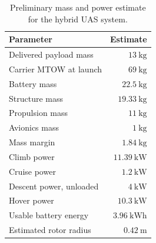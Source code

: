 \begin{table}[H]
    \centering
    \caption{Preliminary mass and power estimate for the hybrid  UAS system.}
    \label{tab:carrier_sizing}
    \begin{tabular}{lr}
        \hline
        Parameter & Estimate \\
        \hline
        Delivered payload mass & $13~\mathrm{kg}$ \\
        Carrier MTOW at launch & $69~\mathrm{kg}$ \\
        Battery mass & $22.5~\mathrm{kg}$ \\
        Structure mass & $19.33~\mathrm{kg}$ \\
        Propulsion mass & $11~\mathrm{kg}$ \\
        Avionics mass & $1~\mathrm{kg}$ \\
        Mass margin & $1.84~\mathrm{kg}$ \\
        Climb power & $11.39~\mathrm{kW}$ \\
        Cruise power & $1.2~\mathrm{kW}$ \\
        Descent power, unloaded & $4~\mathrm{kW}$ \\
        Hover power & $10.3~\mathrm{kW}$\\
        Usable battery energy & $3.96~\mathrm{kWh}$ \\
        Estimated rotor radius & $0.42~\mathrm{m}$ \\
        \hline
    \end{tabular}
\end{table}




